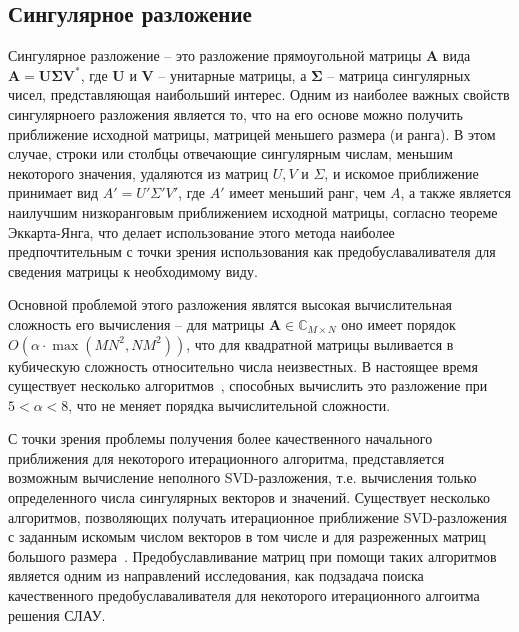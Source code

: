 \subsection{Сингулярное разложение}
Сингулярное разложение -- это разложение прямоугольной матрицы $\mathbf{A}$ вида $\mathbf{A} = \mathbf{U} \mathbf{\Sigma} \mathbf{V}^*$, где $\mathbf{U}$ и $\mathbf{V}$ -- унитарные матрицы, а $\mathbf{\Sigma}$ -- матрица сингулярных чисел, представляющая наибольший интерес. Одним из наиболее важных свойств сингулярноего разложения является то, что на его основе можно получить приближение исходной матрицы, матрицей меньшего размера (и ранга). В этом случае, строки или столбцы отвечающие сингулярным числам, меньшим некоторого значения, удаляются из матриц $U, V$ и $\Sigma$, и искомое приближение принимает вид $A' = U' \Sigma' V'$, где $A'$ имеет меньший ранг, чем $A$, а также является наилучшим низкоранговым приближением исходной матрицы, согласно теореме Эккарта-Янга, что делает использование этого метода наиболее предпочтительным с точки зрения использования как предобуславаливателя для сведения матрицы к необходимому виду.


Основной проблемой этого разложения являтся высокая вычислительная сложность его вычисления -- для матрицы $\mathbf{A} \in \mathbb{C}_{M \times N}$ оно имеет порядок $O\left(\alpha \cdot \max(MN^2, NM^2) \right)$, что для квадратной матрицы выливается в кубическую сложность относительно числа неизвестных. В настоящее время существует несколько алгоритмов~\cite{fastSVD, fitSVD}, способных вычислить это разложение при $5 < \alpha < 8$, что не меняет порядка вычислительной сложности.


С точки зрения проблемы получения более качественного начального приближения для некоторого итерационного алгоритма, представляется возможным вычисление неполного SVD-разложения, т.е. вычисления только определенного числа сингулярных векторов и значений. Существует несколько алгоритмов, позволяющих получать итерационное приближение SVD-разложения с заданным искомым числом векторов в том числе и для разреженных матриц большого размера~\cite{krylovShurIterSVD, blockKrylovIterSVD, twoIterSVD, quicIterSVD, noisyIterSVD}. Предобуславливание матриц при помощи таких алгоритмов является одним из направлений исследования, как подзадача поиска качественного предобуславаливателя для некоторого итерационного алгоитма решения СЛАУ.


